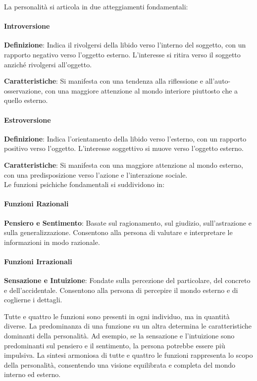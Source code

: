 \documentclass{subfiles}\
\begin{document}
La personalità si articola in due atteggiamenti fondamentali:\\

\paragraph*{Introversione}
\textbf{Definizione}: Indica il rivolgersi della libido verso l'interno del soggetto, con un 
rapporto negativo verso l'oggetto esterno. L'interesse si ritira verso il soggetto anziché 
rivolgersi all'oggetto.

\textbf{Caratteristiche}: Si manifesta con una tendenza alla riflessione e 
all'auto-osservazione, con una maggiore attenzione al mondo interiore piuttosto che a quello esterno.\\

\paragraph*{Estroversione}
\textbf{Definizione}: Indica l'orientamento della libido verso l'esterno, con un rapporto 
positivo verso l'oggetto. L'interesse soggettivo si muove verso l'oggetto esterno.

\textbf{Caratteristiche}: Si manifesta con una maggiore attenzione al mondo esterno, con una 
predisposizione verso l'azione e l'interazione sociale.\\

Le funzioni psichiche fondamentali si suddividono in:

\paragraph*{Funzioni Razionali}
\textbf{Pensiero e Sentimento}: Basate sul ragionamento, sul giudizio, sull'astrazione e 
sulla generalizzazione. Consentono alla persona di valutare e interpretare le informazioni 
in modo razionale.\\

\paragraph*{Funzioni Irrazionali}
\textbf{Sensazione e Intuizione}: Fondate sulla percezione del particolare, del concreto e 
dell'accidentale. Consentono alla persona di percepire il mondo esterno e di coglierne i dettagli.

Tutte e quattro le funzioni sono presenti in ogni individuo, ma in quantità diverse. 
La predominanza di una funzione su un altra determina le caratteristiche dominanti della personalità. 
Ad esempio, se la sensazione e l'intuizione sono predominanti sul pensiero e il sentimento, la 
persona potrebbe essere più impulsiva.
La sintesi armoniosa di tutte e quattro le funzioni rappresenta lo scopo della personalità, 
consentendo una visione equilibrata e completa del mondo interno ed esterno.\\
\end{document}
